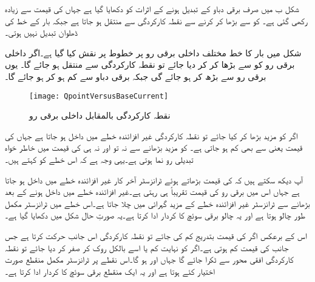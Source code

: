 شکل  ب میں صرف برقی دباو  کے تبدیل ہونے کے اثرات کو دکھایا گیا ہے جہاں  کی قیمت  سے زیادہ رکھی گئی ہے۔  کو   سے بڑھا کر   کرنے سے نقطہ کارکردگی  سے  منتقل ہو جاتا ہے جبکہ بار کے خط کی ڈھلوان تبدیل نہیں ہوتی۔

شکل   میں بار کا خط مختلف داخلی برقی رو  پر   خطوط پر نقش کیا گیا ہے۔اگر داخلی برقی رو کو  سے بڑھا کر   کر دیا جائے تو نقطہ کارکردگی  سے  منتقل ہو جائے گا۔ یوں برقی رو  سے بڑھ کر  ہو جائے گی جبکہ برقی دباو  سے کم ہو کر    ہو جائے گا۔
\begin{figure}
\centering
\texttt{[image: QpointVersusBaseCurrent]}
\caption{نقطہ کارکردگی بالمقابل داخلی برقی رو}
\label{شکل_نکتہ_کارکردگی_بالمقابل_داخلی_برقی_رو}
\end{figure}
اگر  کو مزید بڑھا کر  کیا جائے تو نقطہ کارکردگی غیر افزائندہ خطے میں داخل ہو جاتا ہے جہاں  کی قیمت   یعنی  سے بھی کم ہو جاتی ہے۔  کو مزید بڑھانے سے نہ تو  اور نہ ہی  کی قیمت میں خاطر خواہ تبدیلی رو نما ہوتی ہے۔یہی وجہ ہے کہ اس خطے کو   کہتے ہیں۔

آپ دیکھ سکتے ہیں کہ  کی قیمت بڑھاتے ہوئے ٹرانزسٹر آخر کار غیر افزائندہ خطے میں داخل ہو جاتا ہے جہاں اس میں برقی رو  کی قیمت تقریباً  ہی رہتی ہے۔غیر افزائندہ خطے میں داخل ہونے کے بعد  بڑھانے سے ٹرانزسٹر غیر افزائندہ خطے کے مزید گہرائی میں چلا جاتا ہے۔اس خطے میں ٹرانزسٹر مکمل طور چالو ہوتا ہے اور یہ چالو برقی سوئچ کا کردار ادا کرتا ہے۔یہ صورتِ حال شکل  میں دکھایا گیا ہے۔ 

اس کے برعکس اگر   کی قیمت بتدریج کم کی جائے تو نقطہ کارکردگی اس جانب حرکت کرتا ہے جس جانب   کی قیمت کم ہوتی ہے۔اگر  کو نہایت کم یا اسے بالکل روک کر صفر کر دیا جائے تو نقطہ کارکردگی افقی محور سے ٹکرا جائے گا جہاں  اور  ہو گا۔اس نقطے پر ٹرانزسٹر مکمل منقطع صورت اختیار کئے ہوتا ہے اور یہ ایک منقطع برقی سوئچ کا کردار ادا کرتا ہے۔

